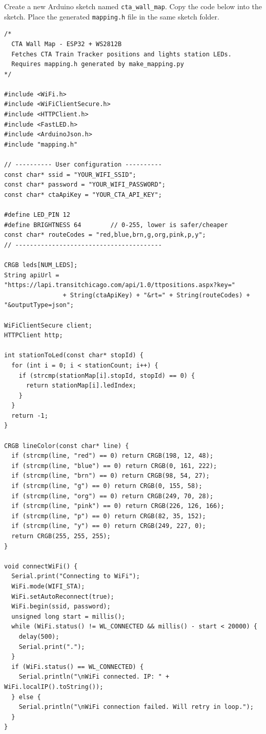 \documentclass[11pt]{article}
\begin{document}
Create a new Arduino sketch named \texttt{cta\_wall\_map}. Copy the code below into the sketch. Place the generated \texttt{mapping.h} file in the same sketch folder.

\begin{lstlisting}[style=arduino,caption={Complete ESP32 Arduino sketch for the CTA wall map.},label={lst:arduino}]
/*
  CTA Wall Map - ESP32 + WS2812B
  Fetches CTA Train Tracker positions and lights station LEDs.
  Requires mapping.h generated by make_mapping.py
*/

#include <WiFi.h>
#include <WiFiClientSecure.h>
#include <HTTPClient.h>
#include <FastLED.h>
#include <ArduinoJson.h>
#include "mapping.h"

// ---------- User configuration ----------
const char* ssid = "YOUR_WIFI_SSID";
const char* password = "YOUR_WIFI_PASSWORD";
const char* ctaApiKey = "YOUR_CTA_API_KEY";

#define LED_PIN 12
#define BRIGHTNESS 64        // 0-255, lower is safer/cheaper
const char* routeCodes = "red,blue,brn,g,org,pink,p,y";
// ----------------------------------------

CRGB leds[NUM_LEDS];
String apiUrl = "https://lapi.transitchicago.com/api/1.0/ttpositions.aspx?key="
                + String(ctaApiKey) + "&rt=" + String(routeCodes) + "&outputType=json";

WiFiClientSecure client;
HTTPClient http;

int stationToLed(const char* stopId) {
  for (int i = 0; i < stationCount; i++) {
    if (strcmp(stationMap[i].stopId, stopId) == 0) {
      return stationMap[i].ledIndex;
    }
  }
  return -1;
}

CRGB lineColor(const char* line) {
  if (strcmp(line, "red") == 0) return CRGB(198, 12, 48);
  if (strcmp(line, "blue") == 0) return CRGB(0, 161, 222);
  if (strcmp(line, "brn") == 0) return CRGB(98, 54, 27);
  if (strcmp(line, "g") == 0) return CRGB(0, 155, 58);
  if (strcmp(line, "org") == 0) return CRGB(249, 70, 28);
  if (strcmp(line, "pink") == 0) return CRGB(226, 126, 166);
  if (strcmp(line, "p") == 0) return CRGB(82, 35, 152);
  if (strcmp(line, "y") == 0) return CRGB(249, 227, 0);
  return CRGB(255, 255, 255);
}

void connectWiFi() {
  Serial.print("Connecting to WiFi");
  WiFi.mode(WIFI_STA);
  WiFi.setAutoReconnect(true);
  WiFi.begin(ssid, password);
  unsigned long start = millis();
  while (WiFi.status() != WL_CONNECTED && millis() - start < 20000) {
    delay(500);
    Serial.print(".");
  }
  if (WiFi.status() == WL_CONNECTED) {
    Serial.println("\nWiFi connected. IP: " + WiFi.localIP().toString());
  } else {
    Serial.println("\nWiFi connection failed. Will retry in loop.");
  }
}


\end{lstlisting}
\end{document}
